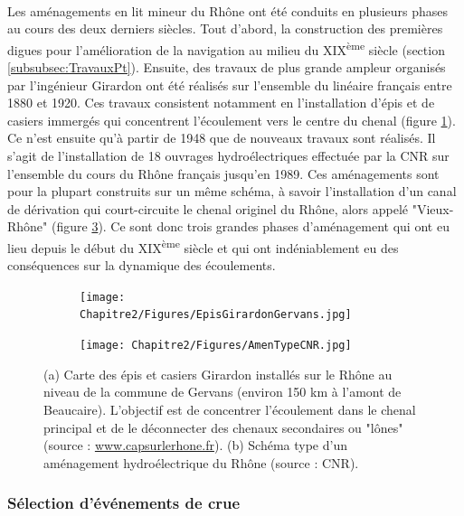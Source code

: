 	\paragraph{} Les aménagements en lit mineur du Rhône ont été conduits en plusieurs phases au cours des deux derniers siècles. Tout d'abord, la construction des premières digues pour l'amélioration de la navigation au milieu du XIX\textsuperscript{ème} siècle (section \ref{subsubsec:TravauxPt}). Ensuite, des travaux de plus grande ampleur organisés par l'ingénieur Girardon ont été réalisés sur l'ensemble du linéaire français entre 1880 et 1920. Ces travaux consistent notamment en l'installation d'épis et de casiers immergés qui concentrent l'écoulement vers le centre du chenal (figure \ref{subfig:Girardon}). Ce n'est ensuite qu'à partir de 1948 que de nouveaux travaux sont réalisés. Il s'agit de l'installation de 18 ouvrages hydroélectriques effectuée par la CNR sur l'ensemble du cours du Rhône français jusqu'en 1989. Ces aménagements sont pour la plupart construits sur un même schéma, à savoir l'installation d'un canal de dérivation qui court-circuite le chenal originel du Rhône, alors appelé "Vieux-Rhône" (figure \ref{subfig:SchemaCNR}). Ce sont donc trois grandes phases d'aménagement qui ont eu lieu depuis le début du XIX\textsuperscript{ème} siècle et qui ont indéniablement eu des conséquences sur la dynamique des écoulements. 
	
	\begin{figure}[h!]
		\centering
		\begin{subfigure}{0.8\linewidth}
		\texttt{[image: Chapitre2/Figures/EpisGirardonGervans.jpg]}
		\caption{}
		\label{subfig:Girardon}
		\end{subfigure}	
		\begin{subfigure}{0.6\linewidth}
		\centering
		\texttt{[image: Chapitre2/Figures/AmenTypeCNR.jpg]}
		\caption{}
		\label{subfig:SchemaCNR}
		\end{subfigure}
		\caption{(a) Carte des épis et casiers Girardon installés sur le Rhône au niveau de la commune de Gervans (environ 150 km à l'amont de Beaucaire). L'objectif est de concentrer l'écoulement dans le chenal principal et de le déconnecter des chenaux secondaires ou "lônes" (source : \url{www.capsurlerhone.fr}). (b) Schéma type d'un aménagement hydroélectrique du Rhône (source : CNR).}
	\end{figure}		

	\FloatBarrier
		
	\subsubsection{Sélection d'événements de crue}
	
